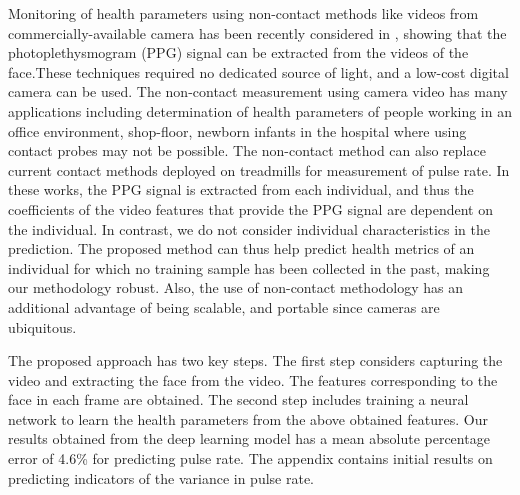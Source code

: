 Monitoring of health parameters using non-contact methods like videos from commercially-available camera has been recently considered in \cite{verkruysse2008remote,poh2011advancements,sun2011motion,kumar2015distanceppg}, showing that the photoplethysmogram (PPG) signal can be extracted from the videos of the face.These techniques required no dedicated source of light, and a  low-cost digital camera can be used. The non-contact measurement using camera video has many applications including determination of health parameters of people working in an office environment, shop-floor, newborn infants in the hospital where using contact probes may not be possible. The non-contact method can also replace current contact methods deployed on treadmills for measurement of pulse rate.  In these works, the PPG signal is extracted from each individual, and thus the coefficients of the video features that provide the PPG signal are dependent on the individual. In contrast, we do not consider individual characteristics in the prediction. The proposed method can thus help predict health metrics of an individual for which no training sample has been collected in the past, making our methodology robust. Also, the use of non-contact methodology has an additional advantage of being scalable, and portable since cameras are ubiquitous. 
%

The proposed approach has two key steps. The first step considers capturing the video and extracting the face from the video. The features corresponding to the face in each frame are obtained. The second step includes training a  neural network to learn the health parameters from the above obtained features. Our results obtained from the deep learning model has a mean absolute percentage error of 4.6\% for predicting pulse rate. The appendix contains initial results on predicting indicators of the variance in pulse rate.

%

%

%

%


%
%



	




